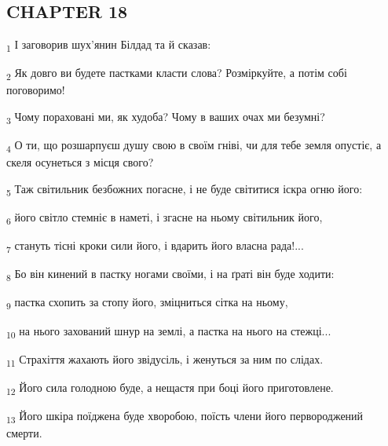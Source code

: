 \subsection{CHAPTER 18}
\begin{tcolorbox}
\textsubscript{1} І заговорив шух'янин Білдад та й сказав:
\end{tcolorbox}
\begin{tcolorbox}
\textsubscript{2} Як довго ви будете пастками класти слова? Розміркуйте, а потім собі поговоримо!
\end{tcolorbox}
\begin{tcolorbox}
\textsubscript{3} Чому пораховані ми, як худоба? Чому в ваших очах ми безумні?
\end{tcolorbox}
\begin{tcolorbox}
\textsubscript{4} О ти, що розшарпуєш душу свою в своїм гніві, чи для тебе земля опустіє, а скеля осунеться з місця свого?
\end{tcolorbox}
\begin{tcolorbox}
\textsubscript{5} Таж світильник безбожних погасне, і не буде світитися іскра огню його:
\end{tcolorbox}
\begin{tcolorbox}
\textsubscript{6} його світло стемніє в наметі, і згасне на ньому світильник його,
\end{tcolorbox}
\begin{tcolorbox}
\textsubscript{7} стануть тісні кроки сили його, і вдарить його власна рада!...
\end{tcolorbox}
\begin{tcolorbox}
\textsubscript{8} Бо він кинений в пастку ногами своїми, і на ґраті він буде ходити:
\end{tcolorbox}
\begin{tcolorbox}
\textsubscript{9} пастка схопить за стопу його, зміцниться сітка на ньому,
\end{tcolorbox}
\begin{tcolorbox}
\textsubscript{10} на нього захований шнур на землі, а пастка на нього на стежці...
\end{tcolorbox}
\begin{tcolorbox}
\textsubscript{11} Страхіття жахають його звідусіль, і женуться за ним по слідах.
\end{tcolorbox}
\begin{tcolorbox}
\textsubscript{12} Його сила голодною буде, а нещастя при боці його приготовлене.
\end{tcolorbox}
\begin{tcolorbox}
\textsubscript{13} Його шкіра поїджена буде хворобою, поїсть члени його первороджений смерти.
\end{tcolorbox}
